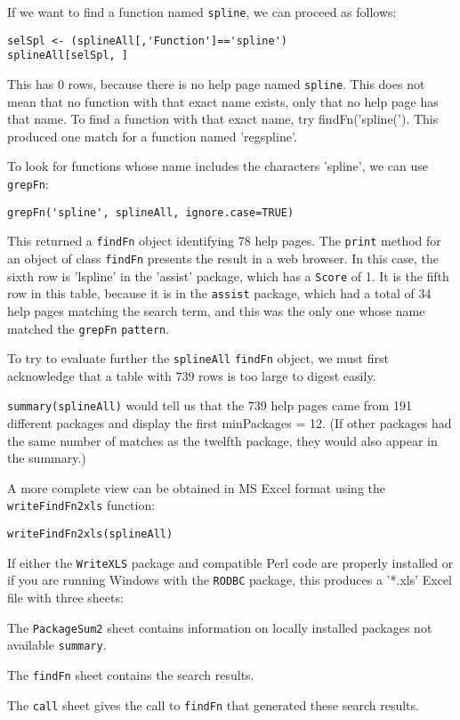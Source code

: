 If we want to find a function named {\tt spline}, we can
proceed as follows:
\begin{verbatim}
selSpl <- (splineAll[,'Function']=='spline')
splineAll[selSpl, ]
\end{verbatim}
This has 0 rows, because there is no help page named
{\tt spline}.  This does not mean that no function
with that exact name exists, only that no help page
has that name.  To find a function with that exact
name, try {findFn('spline(')}.  This produced one match
for a function named 'regspline'.

To look for functions whose name includes the characters 'spline',
we can use {\tt grepFn}:
\begin{verbatim}
grepFn('spline', splineAll, ignore.case=TRUE)
\end{verbatim}
This returned a {\tt findFn} object identifying 78 help pages.
The {\tt print} method for an object of class {\tt findFn}
presents the result in a web browser.  In this case,
the sixth row is 'lspline' in the
'assist' package, which has a {\tt Score} of 1.  It
is the fifth row in this table, because it is in the
{\tt assist} package, which had a total of 34 help
pages matching the search term, and this was the only
one whose name matched the {\tt grepFn} {\tt pattern}.

To try to evaluate further the {\tt splineAll} {\tt findFn}
object, we must first acknowledge that a table with 739 rows
is too large to digest easily.

{\tt summary(splineAll)} would tell us that the 739 help pages
came from 191 different packages and display the first
minPackages = 12.  (If other packages had the same number of
matches as the twelfth package, they would also appear in the
summary.)

A more complete view can be obtained in MS Excel format
using the {\tt writeFindFn2xls} function:
\begin{verbatim}
writeFindFn2xls(splineAll)
\end{verbatim}
If either the {\tt WriteXLS} package and compatible Perl code
are properly installed or if you are running Windows with
the {\tt RODBC} package, this produces a '*.xls' Excel file
with three sheets:

The {\tt PackageSum2} sheet contains information on locally
installed packages not available {\tt summary}.

The {\tt findFn} sheet contains the search results.

The {\tt call} sheet gives the call to {\tt findFn}
that generated these search results.


